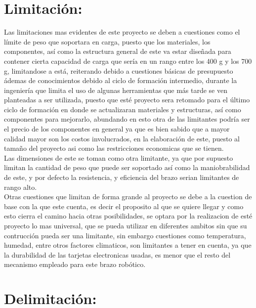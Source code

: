 \documentclass[14pt,a4paper]{article}
\begin{document}
\section{Limitación:}
Las limitaciones mas evidentes de este proyecto se deben a cuestiones como el límite de peso que soportara en carga, puesto que los materiales, los componentes, así como la estructura general de este va estar diseñada para contener cierta capacidad de carga que sería en un rango entre los 400 g y los 700 g, limitandose a está, reiterando debido a cuestiones básicas de presupuesto ádemas de conocimientos debido al ciclo de formación intermedio, durante la ingeniería que limita el uso de algunas herramientas que más tarde se ven planteadas a ser utilizada, puesto que esté proyecto sera retomado para el último ciclo de formación en donde se actualizaran materiales y estructuras, así como componentes para mejorarlo, abundando en esto otra de las limitantes podría ser el precio de los componentes en general ya que es bien sabido que a mayor calidad mayor son los costos involucrados, en la elaboración de este, puesto al tamaño del proyecto asi como las restricciones economicas que se tienen.\\
Las dimensiones de este se toman como otra limitante, ya que por supuesto limitan la cantidad de peso que puede ser soportado así como la maniobrabilidad de este, y por defecto la resistencia, y eficiencia del brazo serian limitantes de rango alto.\\
Otras cuestiones que limitan de forma grande al proyecto se debe a la cuestion de base con la que este cuenta, es decir el proposito al que se quiere llegar y como esto cierra el camino hacia otras posibilidades, se optara por la realizacion de esté proyecto lo mas universal, que se pueda utilizar en diferentes ambitos sin que su contrucción pueda ser una limitante, sin embargo cuestiones como temperatura, humedad, entre otros factores climaticos, son limitantes a tener en cuenta, ya que la durabilidad de las tarjetas electronicas usadas, es menor que el resto del mecanismo empleado para este brazo robótico.

\section{Delimitación:}
\end{document}
